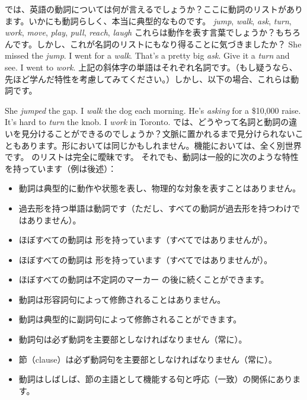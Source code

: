 では、英語の動詞については何が言えるでしょうか？ここに動詞のリストがあります。いかにも動詞らしく、本当に典型的なものです。
\ea
    \emph{jump}, \emph{walk}, \emph{ask}, \emph{turn}, \emph{work}, \emph{move}, \emph{play}, \emph{pull}, \emph{reach}, \emph{laugh} \label{ex:verblist}
\z
{}これらは動作を表す言葉でしょうか？もちろんです。しかし、これが名詞のリストにもなり得ることに気づきましたか？
\ea\label{ex:verb-list-as-nouns}
    \ea She missed the \emph{jump}.
    \ex I went for a \emph{walk}.
    \ex That's a pretty big \emph{ask}.
    \ex Give it a \emph{turn} and see.
    \ex I went to \emph{work}.
\z
\z
上記の斜体字の単語はそれぞれ名詞です。（もし疑うなら、先ほど学んだ特性を考慮してみてください。）しかし、以下の場合、これらは動詞です。

\ea\label{ex:verb-list-as-verbs}
    \ea She \emph{jumped} the gap.
    \ex I \emph{walk} the dog each morning.
    \ex He's \emph{asking} for a \$10,000 raise.
    \ex It's hard to \emph{turn} the knob.
    \ex I \emph{work} in Toronto.
\z
\z
では、どうやって名詞と動詞の違いを見分けることができるのでしょうか？文脈に置かれるまで見分けられないこともあります。形においては同じかもしれません。機能においては、全く別世界です。 のリストは完全に曖昧です。 それでも、動詞は一般的に次のような特性を持っています（例は後述）：

\begin{itemize}[noitemsep]
    \item {}動詞は典型的に動作や状態を表し、物理的な対象を表すことはありません。
    \item {}過去形を持つ単語は動詞です（ただし、すべての動詞が過去形を持つわけではありません）。
    \item ほぼすべての動詞は  形を持っています（すべてではありませんが）。
    \item ほぼすべての動詞は  形を持っています（すべてではありませんが）。
    \item ほぼすべての動詞は不定詞のマーカー  の後に続くことができます。
    \item 動詞は形容詞句によって修飾されることはありません。
    \item {}動詞は典型的に副詞句によって修飾されることができます。
    \item 動詞句は必ず動詞を主要部としなければなりません（常に）。
    \item {}節（clause）は必ず動詞句を主要部としなければなりません（常に）。
    \item {}動詞はしばしば、節の主語として機能する句と呼応（一致）の関係にあります。
\end{itemize}

